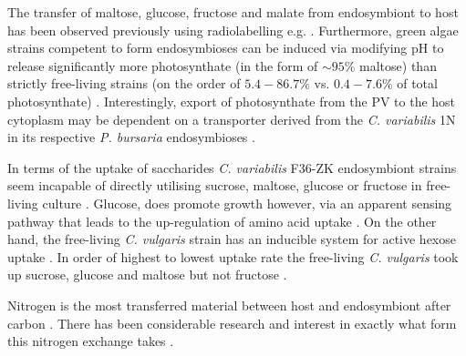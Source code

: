 
The transfer of maltose, glucose, fructose and malate from endosymbiont
to host has been observed previously using radiolabelling e.g.
\citep{Brown1974}.  Furthermore, green algae strains competent to
form endosymbioses can be induced via modifying pH to release significantly
more photosynthate (in the form of \(\sim 95\%\) maltose) than strictly free-living strains
(on the order of \(5.4-86.7\%\) vs. \(0.4-7.6\%\) 
of total photosynthate) \citep{Muscatine1967a}.
Interestingly, export of photosynthate from the PV to the host cytoplasm may be dependent on a transporter
derived from the \textit{C. variabilis} 1N in its respective \textit{P. bursaria} endosymbioses \citep{Kodama2008}.

In terms of the uptake of saccharides
\textit{C. variabilis} F36-ZK endosymbiont strains
seem incapable of directly utilising sucrose, maltose, glucose or fructose in free-living culture \citep{Kamako2005,Kato2009a}.
Glucose, does promote growth however, via an apparent sensing pathway that leads to the up-regulation
of amino acid uptake \citep{Kato2009a}.
On the other hand, the free-living \textit{C. vulgaris} strain has an inducible 
system for active hexose uptake \citep{Tanner1974}.
In order of highest to lowest uptake rate the free-living \textit{C. vulgaris} 
took up sucrose, glucose and maltose but not fructose \citep{Kato2009a}.



Nitrogen is the most transferred material between host and endosymbiont
after carbon \citep{Kato2009a}.  There has been considerable research and interest
in exactly what form this nitrogen exchange takes \citep{Kato2006,Kamako2005,McAuley1986}.

